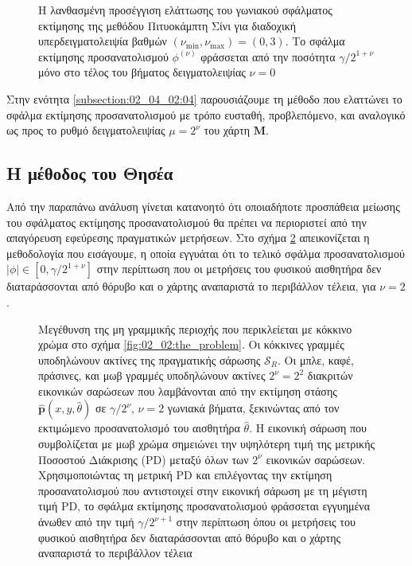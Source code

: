 \begin{figure}[h]\centering
  
  \caption{\small Η λανθασμένη προσέγγιση ελάττωσης του γωνιακού σφάλματος
           εκτίμησης της μεθόδου Πιτυοκάμπτη Σίνι για διαδοχική
           υπερδειγματολειψία βαθμών $(\nu_{\min}, \nu_{\max}) = (0,3)$. Το
           σφάλμα εκτίμησης προσανατολισμού $\phi^{(\nu)}$ φράσσεται από την
           ποσότητα $\gamma/2^{1+\nu}$ μόνο στο τέλος του βήματος
           δειγματολειψίας $\nu=0$}
  \label{fig:02_04_02:sinis}
\end{figure}

Στην ενότητα \ref{subsection:02_04_02:04} παρουσιάζουμε τη μέθοδο που ελαττώνει
το σφάλμα εκτίμησης προσανατολισμού με τρόπο ευσταθή, προβλεπόμενο, και
αναλογικό ως προς το ρυθμό δειγματολειψίας $\mu = 2^{\nu}$ του χάρτη $\bm{M}$.

\subsection{Η μέθοδος του Θησέα}
\label{subsection:02_04_02:06}

Από την παραπάνω ανάλυση γίνεται κατανοητό ότι οποιαδήποτε προσπάθεια
μείωσης του σφάλματος εκτίμησης προσανατολισμού θα πρέπει να περιοριστεί από
την απαγόρευση εφεύρεσης πραγματικών μετρήσεων. Στο σχήμα
\ref{fig:oversampling_correct} απεικονίζεται η μεθοδολογία που εισάγουμε, η
οποία εγγυάται ότι το τελικό σφάλμα προσανατολισμού $|\phi| \in [0,\gamma /
2^{1+\nu}]$ στην περίπτωση που οι μετρήσεις του φυσικού αισθητήρα δεν
διαταράσσονται από θόρυβο και ο χάρτης αναπαριστά το περιβάλλον τέλεια, για
$\nu = 2$.

\begin{figure}[h]\centering
  
  \caption{\small Μεγέθυνση της μη γραμμικής περιοχής που περικλείεται με
           κόκκινο χρώμα στο σχήμα \ref{fig:02_02:the_problem}. Οι κόκκινες
           γραμμές υποδηλώνουν ακτίνες της πραγματικής σάρωσης $\mathcal{S}_R$.
           Οι μπλε, καφέ, πράσινες, και μωβ γραμμές υποδηλώνουν
           ακτίνες $2^\nu = 2^2$ διακριτών εικονικών σαρώσεων που λαμβάνονται
           από την εκτίμηση στάσης $\hat{\bm{p}}(x,y,\hat{\theta})$ σε
           $\gamma/2^\nu$, $\nu = 2$ γωνιακά βήματα, ξεκινώντας από τον
           εκτιμώμενο προσανατολισμό του αισθητήρα $\hat{\theta}$. Η εικονική
           σάρωση που συμβολίζεται με μωβ χρώμα σημειώνει την υψηλότερη τιμή
           της μετρικής Ποσοστού Διάκρισης (PD) μεταξύ όλων των $2^\nu$
           εικονικών σαρώσεων. Χρησιμοποιώντας τη μετρική PD και επιλέγοντας
           την εκτίμηση προσανατολισμού που αντιστοιχεί στην εικονική σάρωση με
           τη μέγιστη τιμή PD, το σφάλμα εκτίμησης προσανατολισμού φράσσεται
           εγγυημένα άνωθεν από την τιμή $\gamma/2^{\nu+1}$ στην περίπτωση
           όπου οι μετρήσεις του φυσικού αισθητήρα δεν διαταράσσονται από
           θόρυβο και ο χάρτης αναπαριστά το περιβάλλον τέλεια}
  \label{fig:oversampling_correct}
\end{figure}


